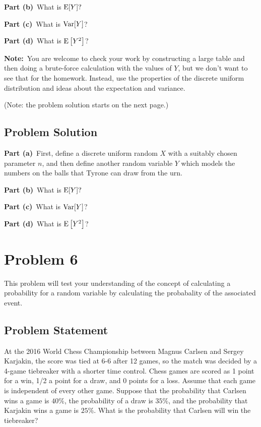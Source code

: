 \documentclass[12pt]{article}
\theoremstyle{definition}
\begin{document}
\bigskip
\noindent
{\bf Part (b)}\ What is $\hbox{E}[Y]?$

\bigskip
\noindent
{\bf Part (c)}\ What is $\hbox{Var}[Y]$?


\bigskip
\noindent
{\bf Part (d)}\ What is $\hbox{E}\left[ Y^2 \right ]$?


\bigskip
\noindent
{\bf Note:}\ You are welcome to check your work by constructing a large table and then doing a brute-force calculation with the values of $Y$, but we don't want to see that for the homework. Instead, use the properties of the discrete uniform distribution and ideas about the expectation and variance.

\bigskip
\noindent
(Note: the problem solution starts on the next page.)

\newpage
\subsection*{Problem Solution}

\noindent
{\bf Part (a)}\ First, define a discrete uniform random $X$ with a suitably chosen parameter $n$, and then define another random variable $Y$ which models the numbers on the balls that Tyrone can draw from the urn.

\vspace{3in}
\noindent
{\bf Part (b)}\ What is $\hbox{E}[Y]?$

\newpage
\noindent
{\bf Part (c)}\ What is $\hbox{Var}[Y]$?


\vspace{4in}
\noindent
{\bf Part (d)}\ What is $\hbox{E}\left[ Y^2 \right ]$?



\newpage
\section*{Problem 6}

This problem will test your understanding of the concept of calculating a probability for a random variable by calculating the probabality of the associated event.

\subsection*{Problem Statement}

At the 2016 World Chess Championship between Magnus Carlsen and Sergey Karjakin, the score was tied at 6-6 after 12 games, so the match was decided by a 4-game tiebreaker with a shorter time control. Chess games are scored as 1 point for a win, 1/2 a point for a draw, and 0 points for a loss. Assume that each game is independent of every other game. Suppose that the probability that Carlsen wins a game is $40\%$, the probability of a draw is $35\%$, and the probability that Karjakin wins a game is $25\%$. What is the probability that Carlsen will win the tiebreaker?
\end{document}

